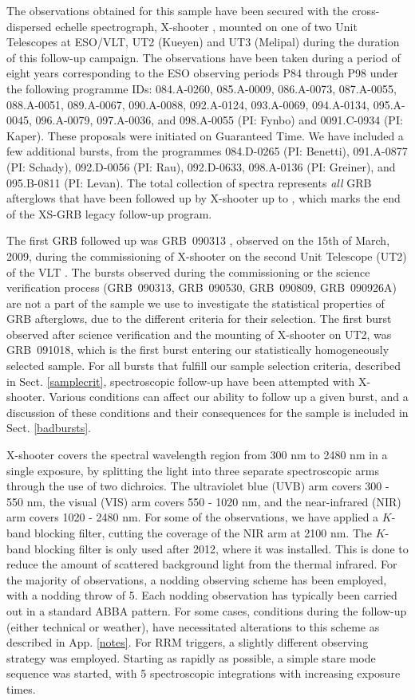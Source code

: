 \documentclass[longauth]{aa}    %
\begin{document}
The observations obtained for this sample have been secured with the
cross-dispersed echelle spectrograph, X-shooter \citep{Vernet2011}, mounted on
one of two Unit Telescopes at ESO/VLT, UT2 (Kueyen) and UT3 (Melipal) during the
duration of this follow-up campaign. The observations have been taken during a
period of eight years corresponding to the ESO observing periods P84 through P98
under the following programme IDs: 084.A-0260, 085.A-0009, 086.A-0073,
087.A-0055, 088.A-0051, 089.A-0067, 090.A-0088, 092.A-0124, 093.A-0069,
094.A-0134, 095.A-0045, 096.A-0079, 097.A-0036, and 098.A-0055 (PI: Fynbo) and
0091.C-0934 (PI: Kaper). These proposals were initiated on Guaranteed Time. We
have included a few additional bursts, from the programmes 084.D-0265 (PI:
Benetti), 091.A-0877 (PI: Schady), 092.D-0056 (PI: Rau), 092.D-0633,
098.A-0136 (PI: Greiner), and 095.B-0811 (PI: Levan). The total collection of
spectra represents \textit{all} GRB afterglows that have been followed up by
X-shooter up to \termdate, which marks the end of the XS-GRB legacy follow-up
program.

The first GRB followed up was GRB~090313 \citep{DeUgartePostigo2010}, observed
on the 15th of March, 2009, during the commissioning of X-shooter on the second
Unit Telescope (UT2) of the VLT . The bursts observed during the commissioning
or the science verification process (GRB~090313, GRB~090530, GRB~090809,
GRB~090926A) are not a part of the sample we use to investigate the statistical
properties of GRB afterglows, due to the different criteria for their selection. The
first burst observed after science verification and the mounting of X-shooter on UT2,
was GRB~091018, which is the first burst entering our statistically homogeneously selected
sample. For all bursts that fulfill our sample selection criteria, described in
Sect. \ref{samplecrit}, spectroscopic follow-up have been attempted with
X-shooter. Various conditions can affect our ability to follow up a given burst,
and a discussion of these conditions and their consequences for the sample is
included in Sect. \ref{badbursts}.

X-shooter covers the spectral wavelength region from 300 nm to 2480 nm in a
single exposure, by splitting the light into three separate spectroscopic arms
through the use of two dichroics. The ultraviolet blue (UVB) arm covers 300 -
550 nm, the visual (VIS) arm covers 550 - 1020 nm, and the near-infrared (NIR)
arm covers 1020 - 2480 nm. For some of the observations, we have applied a
$K$-band blocking filter, cutting the coverage of the NIR arm at 2100 nm. The
$K$-band blocking filter is only used after 2012, where it was installed. This
is done to reduce the amount of scattered background light from the thermal
infrared. For the majority of observations, a nodding observing scheme
has been employed, with a nodding throw of 5\arcsec. Each nodding observation
has typically been carried out in a standard ABBA pattern. For some cases,
conditions during the follow-up (either technical or weather), have necessitated
alterations to this scheme as described in App. \ref{notes}. For RRM triggers, a
slightly different observing strategy was employed. Starting as rapidly as
possible, a simple stare mode sequence was started, with 5 spectroscopic
integrations with increasing exposure times.
\end{document}
